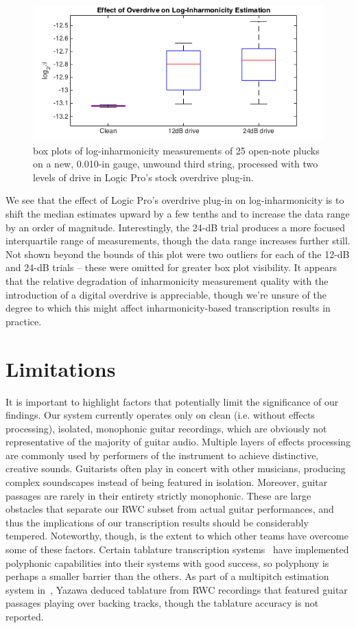 \documentclass[12pt]{cmuthesis}
\begin{document}
\begin{figure}[!htbp] 
\centering
\includegraphics[scale=0.6]{eg-params-od}
\caption{box plots of log-inharmonicity measurements of 25 open-note plucks on a new, 0.010-in gauge, unwound third string, processed with two levels of drive in Logic Pro's stock overdrive plug-in.}
\label{fig:eg-params-od}
\end{figure} 

We see that the effect of Logic Pro's overdrive plug-in on log-inharmonicity is to shift the median estimates upward by a few tenths and to increase the data range by an order of magnitude. Interestingly, the 24-dB trial produces a more focused interquartile range of measurements, though the data range increases further still. Not shown beyond the bounds of this plot were two outliers for each of the 12-dB and 24-dB trials -- these were omitted for greater box plot visibility. It appears that the relative degradation of inharmonicity measurement quality with the introduction of a digital overdrive is appreciable, though we're unsure of the degree to which this might affect inharmonicity-based transcription results in practice.

\section{Limitations}
It is important to highlight factors that potentially limit the significance of our findings. Our system currently operates only on clean (i.e. without effects processing), isolated, monophonic guitar recordings, which are obviously not representative of the majority of guitar audio. Multiple layers of effects processing are commonly used by performers of the instrument to achieve distinctive, creative sounds. Guitarists often play in concert with other musicians, producing complex soundscapes instead of being featured in isolation. Moreover, guitar passages are rarely in their entirety strictly monophonic. These are large obstacles that separate our RWC subset from actual guitar performances, and thus the implications of our transcription results should be considerably tempered. Noteworthy, though, is the extent to which other teams have overcome some of these factors. Certain tablature transcription systems~\cite{barbanchoi2012,abesser2012,dittmar2013,kehling2014} have implemented polyphonic capabilities into their systems with good success, so polyphony is perhaps a smaller barrier than the others. As part of a multipitch estimation system in~\cite{yazawa2013}, Yazawa deduced tablature from RWC recordings that featured guitar passages playing over backing tracks, though the tablature accuracy is not reported.
\end{document}
